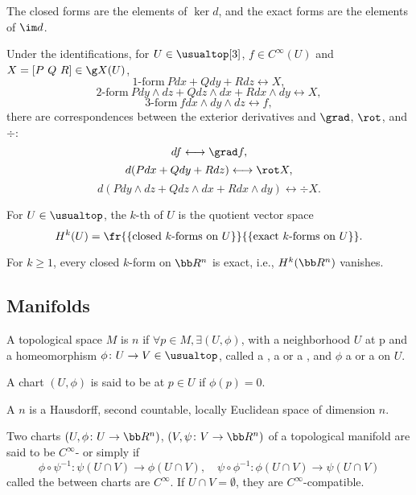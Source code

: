 The closed forms are the elements of $\ker d$, and the exact forms are the elements of $\im d$.

Under the identifications, for $U \in \usualtop[3]$, $f \in C^\infty(U)$ and $X = [P\ Q\ R] \in \g X(U)$,
\[
1\text{-form}\ Pdx + Qdy + Rdz \longleftrightarrow X,
\]
\[
2\text{-form}\ Pdy\wedge dz + Qdz\wedge dx + Rdx\wedge dy \longleftrightarrow X,
\]
\[
3\text{-form}\ f dx\wedge dy\wedge dz \longleftrightarrow f,
\]
there are correspondences between the exterior derivatives and $\grad$, $\rot$, and $\div$:
\[
df \longleftrightarrow \grad f,
\]
\[
d(Pdx + Qdy + Rdz) \longleftrightarrow \rot X,
\]
\[
d(Pdy\wedge dz + Qdz\wedge dx + Rdx\wedge dy) \longleftrightarrow \div X.
\]

For $U \in \usualtop$, the $k$-th  of $U$ is the quotient vector space
\[
H^k (U) = \fr{\{ \text{closed}\ k\text{-forms on}\ U\}}{\{\text{exact}\ k\text{-forms on}\ U\}}.
\]

For $k \ge 1$, every closed $k$-form on $\bb R^n$ is exact, i.e., $H^k (\bb R^n)$ vanishes.

\subsection{Manifolds}
A topological space $M$ is  $n$ if $\forall p \in M,\exists (U, \phi)$, with a neighborhood $U$ at p and a homeomorphism $\phi \colon U \to V \in \usualtop$, called a , a  or a , and $\phi$ a  or a  on $U$.

A chart $(U, \phi)$ is said to be  at $p \in U$ if $\phi(p) = 0$.

A  $n$ is a Hausdorff, second countable, locally Euclidean space of dimension $n$.

Two charts $(U, \phi \colon U \to \bb R^n)$, $(V, \psi \colon V \to \bb R^n)$ of a topological manifold are said to be $C^\infty$- or simply  if
\[
\phi \circ \psi^{-1} \colon \psi(U \cap V) \to \phi (U \cap V),\quad \psi \circ \phi^{-1} \colon \phi(U\cap V) \to \psi(U\cap V)
\]
called the  between charts are $C^\infty$. If $U \cap V = \emptyset$, they are $C^\infty$-compatible.

